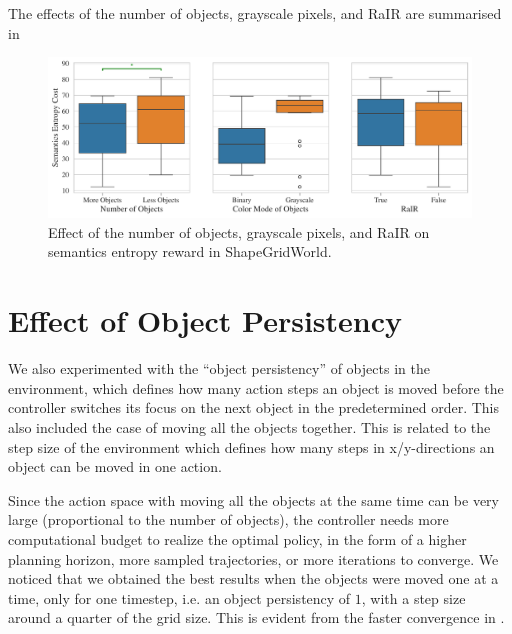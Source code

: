 The effects of the number of objects, grayscale pixels, and RaIR are summarised in 
\begin{figure}[h]
    \centering
    \includegraphics[width=\textwidth]{images/nobj_mode_rair_sgw_boxplot.pdf}
    \caption{Effect of the number of objects, grayscale pixels, and RaIR on semantics entropy reward in ShapeGridWorld.}
    \label{fig:nobj-mode-sgw}
\end{figure}

\newpage
\section{Effect of Object Persistency}
\label{sec:sgw-persistency}

We also experimented with the ``object persistency'' of objects in the environment, which defines how many action steps an object is moved before the controller switches its focus on the next object in the predetermined order.
This also included the case of moving all the objects together.
This is related to the step size of the environment which defines how many steps in x/y-directions an object can be moved in one action.

Since the action space with moving all the objects at the same time can be very large (proportional to the number of objects), the controller needs more computational budget to realize the optimal policy, in the form of a higher planning horizon, more sampled trajectories, or more iterations to converge.
We noticed that we obtained the best results when the objects were moved one at a time, only for one timestep, i.e. an object persistency of \(1\), with a step size around a quarter of the grid size.
This is evident from the faster convergence in .

